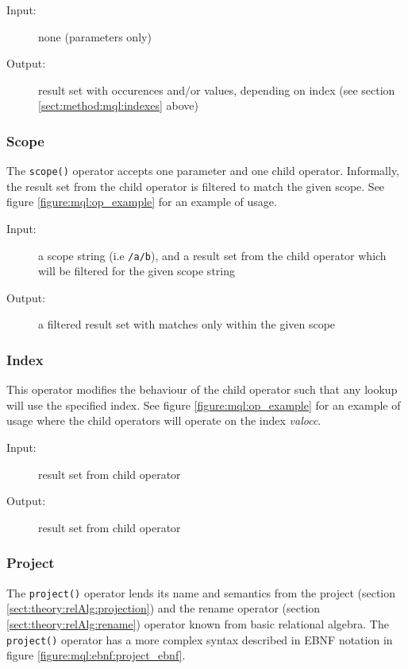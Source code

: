 \begin{description}
  \item[Input:] none (parameters only)
  \item[Output:] result set with occurences and/or values, depending on index
(see section \ref{sect:method:mql:indexes} above)
\end{description}

\subsubsection{Scope}
\label{sect:method:marsOperators:scope}
The \texttt{scope()} operator accepts one parameter and one child operator. Informally, the
result set from the child operator is filtered to match the given scope. See
figure \ref{figure:mql:op_example} for an example of usage.

\begin{description}
  \item[Input:] a scope string (i.e \texttt{/a/b}), and a result set from the
child operator which will be filtered for the given scope string
  \item[Output:] a filtered result set with matches only within the given scope
\end{description}

\subsubsection{Index}
\label{sect:method:marsOperators:index}
This operator modifies the behaviour of the child operator such that any lookup
will use the specified index. See figure \ref{figure:mql:op_example} for an
example of usage where the child operators will operate on the index
\textit{valocc}.

\begin{description}
  \item[Input:] result set from child operator
  \item[Output:] result set from child operator
\end{description}

\subsubsection{Project}
\label{sect:method:marsOperators:project}
The \texttt{project()} operator lends its name and semantics from the project (section
\ref{sect:theory:relAlg:projection}) and the rename operator (section \ref{sect:theory:relAlg:rename}) operator
known from basic relational algebra. The \texttt{project()} operator has a more complex syntax described in EBNF
notation in figure \ref{figure:mql:ebnf:project_ebnf}.

